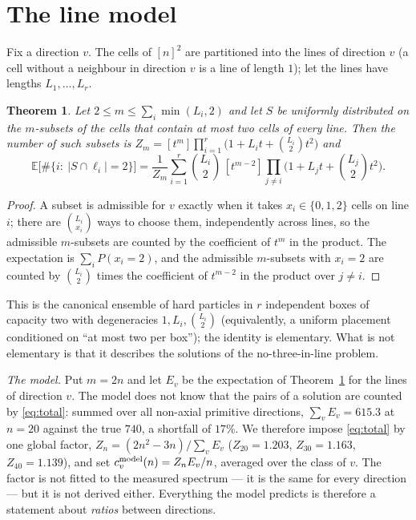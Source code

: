 \documentclass[11pt,a4paper]{article}
\newtheorem{theorem}{Theorem}
\begin{document}
\section{The line model}
Fix a direction $v$.  The cells of $[n]^2$ are partitioned into the lines of direction $v$ (a cell without a
neighbour in direction $v$ is a line of length $1$); let the lines have lengths $L_1,\dots,L_r$.

\begin{theorem}\label{thm:gf}
Let $2\le m\le\sum_i\min(L_i,2)$ and let $S$ be uniformly distributed on the $m$-subsets of the cells that contain at
most two cells of every line.  Then the number of such subsets is $Z_m=[t^m]\prod_{i=1}^{r}\bigl(1+L_it+\binom{L_i}{2}t^2\bigr)$
and
\[\mathbb{E}\bigl[\#\{i:\ |S\cap\ell_i|=2\}\bigr]=\frac{1}{Z_m}\sum_{i=1}^{r}\binom{L_i}{2}\,[t^{m-2}]\prod_{j\ne i}\bigl(1+L_jt+\binom{L_j}{2}t^2\bigr).\]
\end{theorem}
\begin{proof}
A subset is admissible for $v$ exactly when it takes $x_i\in\{0,1,2\}$ cells on line $i$; there are $\binom{L_i}{x_i}$
ways to choose them, independently across lines, so the admissible $m$-subsets are counted by the coefficient of $t^m$
in the product.  The expectation is $\sum_iP(x_i=2)$, and the admissible $m$-subsets with $x_i=2$ are counted by
$\binom{L_i}{2}$ times the coefficient of $t^{m-2}$ in the product over $j\ne i$.
\end{proof}

This is the canonical ensemble of hard particles in $r$ independent boxes of capacity two with degeneracies
$1,L_i,\binom{L_i}{2}$ (equivalently, a uniform placement conditioned on ``at most two per box''); the identity is
elementary.  What is not elementary is that it describes the solutions of the no-three-in-line problem.

\emph{The model.}  Put $m=2n$ and let $E_v$ be the expectation of Theorem~\ref{thm:gf} for the lines of direction $v$.
The model does not know that the pairs of a solution are counted by \eqref{eq:total}: summed over all non-axial
primitive directions, $\sum_vE_v=615.3$ at $n=20$ against the true $740$, a shortfall of $17\%$.  We therefore
impose \eqref{eq:total} by one global factor, $Z_n=(2n^2-3n)/\sum_vE_v$ ($Z_{20}=1.203$, $Z_{30}=1.163$,
$Z_{40}=1.139$), and set $c^{\rm model}_v(n)=Z_nE_v/n$, averaged over the class of $v$.  The factor is not fitted to
the measured spectrum --- it is the same for every direction --- but it is not derived either.  Everything the model
predicts is therefore a statement about \emph{ratios} between directions.
\end{document}
